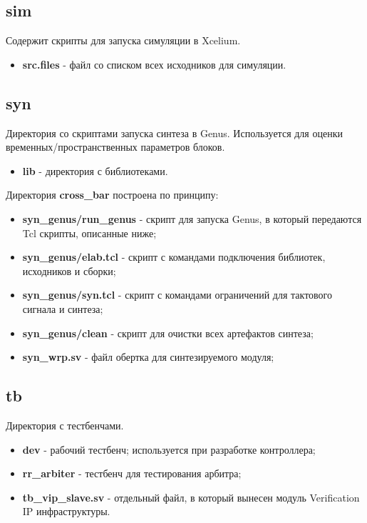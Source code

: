 \documentclass[a4paper, 10pt]{article}
\begin{document}
\subsection{sim}

Содержит скрипты для запуска симуляции в Xcelium.
\begin{itemize}
 \item \textbf{src.files} - файл со списком всех исходников для симуляции.
\end{itemize}

\subsection{syn}

Директория со скриптами запуска синтеза в Genus. Используется для оценки временных/пространственных параметров блоков.
\begin{itemize}
 \item \textbf{lib} - директория с библиотеками.
\end{itemize}

Директория \textbf{cross\_bar} построена по принципу:
\begin{itemize}
 \item \textbf{syn\_genus/run\_genus} - скрипт для запуска Genus, в который передаются Tcl скрипты, описанные ниже;
 \item \textbf{syn\_genus/elab.tcl} - скрипт с командами подключения библиотек, исходников и сборки;
 \item \textbf{syn\_genus/syn.tcl} - скрипт с командами ограничений для тактового сигнала и синтеза;
 \item \textbf{syn\_genus/clean} - скрипт для очистки всех артефактов синтеза;
 \item \textbf{syn\_wrp.sv} - файл обертка для синтезируемого модуля;
\end{itemize}


\subsection{tb}

Директория с тестбенчами.
\begin{itemize}
 \item \textbf{dev} - рабочий тестбенч; используется при разработке контроллера;
 \item \textbf{rr\_arbiter} - тестбенч для тестирования арбитра;
 \item \textbf{tb\_vip\_slave.sv} - отдельный файл, в который вынесен модуль Verification IP инфраструктуры.
\end{itemize}
\end{document}
